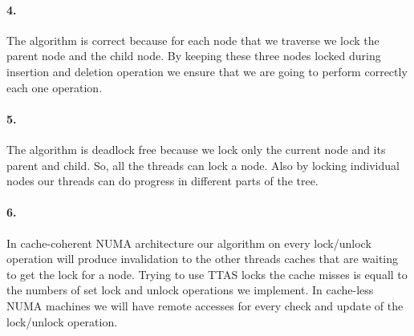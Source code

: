 \paragraph{4.}
The algorithm is correct because for each node that we traverse we
lock the parent node and the child node. By keeping these three nodes
locked during insertion and deletion operation we ensure that we are
going to perform correctly each one operation.

\paragraph{5.}
The algorithm is deadlock free because we lock only the current node
and its parent and child. So, all the threads can lock a node. Also by
locking individual nodes our threads can do progress in different
parts of the tree.

\paragraph{6.}
In cache-coherent NUMA architecture our algorithm on every lock/unlock
operation will produce invalidation to the other threads caches that
are waiting to get the lock for a node. Trying to use TTAS locks the
cache misses is equall to the numbers of set lock and unlock
operations we implement. In cache-less NUMA machines we will have
remote accesses for every check and update of the lock/unlock
operation. 

